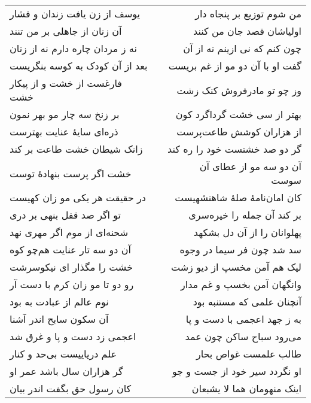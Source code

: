 \begin{center}
\begin{longtable}{l p{0.5cm} r}
یوسف از زن یافت زندان و فشار
&&
من شوم توزیع بر پنجاه دار
\\
آن زنان از جاهلی بر من تنند
&&
اولیاشان قصد جان من کنند
\\
نه ز مردان چاره دارم نه از زنان
&&
چون کنم که نی ازینم نه از آن
\\
بعد از آن کودک به کوسه بنگریست
&&
گفت او با آن دو مو از غم بریست
\\
فارغست از خشت و از پیکار خشت
&&
وز چو تو مادرفروش کنک زشت
\\
بر زنخ سه چار مو بهر نمون
&&
بهتر از سی خشت گرداگرد کون
\\
ذره‌ای سایهٔ عنایت بهترست
&&
از هزاران کوشش طاعت‌پرست
\\
زانک شیطان خشت طاعت بر کند
&&
گر دو صد خشتست خود را ره کند
\\
خشت اگر پرست بنهادهٔ توست
&&
آن دو سه مو از عطای آن سوست
\\
در حقیقت هر یکی مو زان کهیست
&&
کان امان‌نامهٔ صلهٔ شاهنشهیست
\\
تو اگر صد قفل بنهی بر دری
&&
بر کند آن جمله را خیره‌سری
\\
شحنه‌ای از موم اگر مهری نهد
&&
پهلوانان را از آن دل بشکهد
\\
آن دو سه تار عنایت هم‌چو کوه
&&
سد شد چون فر سیما در وجوه
\\
خشت را مگذار ای نیکوسرشت
&&
لیک هم آمن مخسپ از دیو زشت
\\
رو دو تا مو زان کرم با دست آر
&&
وانگهان آمن بخسپ و غم مدار
\\
نوم عالم از عبادت به بود
&&
آنچنان علمی که مستنبه بود
\\
آن سکون سابح اندر آشنا
&&
به ز جهد اعجمی با دست و پا
\\
اعجمی زد دست و پا و غرق شد
&&
می‌رود سباح ساکن چون عمد
\\
علم دریاییست بی‌حد و کنار
&&
طالب علمست غواص بحار
\\
گر هزاران سال باشد عمر او
&&
او نگردد سیر خود از جست و جو
\\
کان رسول حق بگفت اندر بیان
&&
اینک منهومان هما لا یشبعان
\\
\end{longtable}
\end{center}

